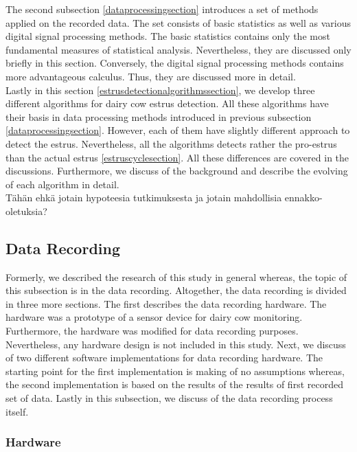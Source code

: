 \documentclass[english,12pt,a4paper,pdftex,elec,utf8]{aaltothesis}
\begin{document}
The second subsection \ref{dataprocessingsection} introduces a set of methods applied on the recorded data. The set consists of basic statistics as well as various digital signal processing methods. The basic statistics contains only the most fundamental measures of statistical analysis. Nevertheless, they are discussed only briefly in this section. Conversely, the digital signal processing methods contains more advantageous calculus. Thus, they are discussed more in detail. \\

Lastly in this section \ref{estrusdetectionalgorithmssection}, we develop three different algorithms for dairy cow estrus detection. All these algorithms have their basis in data processing methods introduced in previous subsection \ref{dataprocessingsection}. However, each of them have slightly different approach to detect the estrus. Nevertheless, all the algorithms detects rather the pro-estrus than the actual estrus \ref{estruscyclesection}. All these differences are covered in the discussions. Furthermore, we discuss of the background and describe the evolving of each algorithm in detail. \\


Tähän ehkä jotain hypoteesia tutkimuksesta ja jotain mahdollisia ennakko-oletuksia?



\subsection{Data Recording} \label{datarecordingsection}

Formerly, we described the research of this study in general whereas, the topic of this subsection is in the data recording. Altogether, the data recording is divided in three more sections. The first describes the data recording hardware. The hardware was a prototype of a sensor device for dairy cow monitoring. Furthermore, the hardware was modified for data recording purposes. Nevertheless, any hardware design is not included in this study. Next, we discuss of two different software implementations for data recording hardware. The starting point for the first implementation is making of no assumptions whereas, the second implementation is based on the results of the results of first recorded set of data. Lastly in this subsection, we discuss of the data recording process itself.  \\



\subsubsection{Hardware} \label{hardwaresection}
\end{document}
